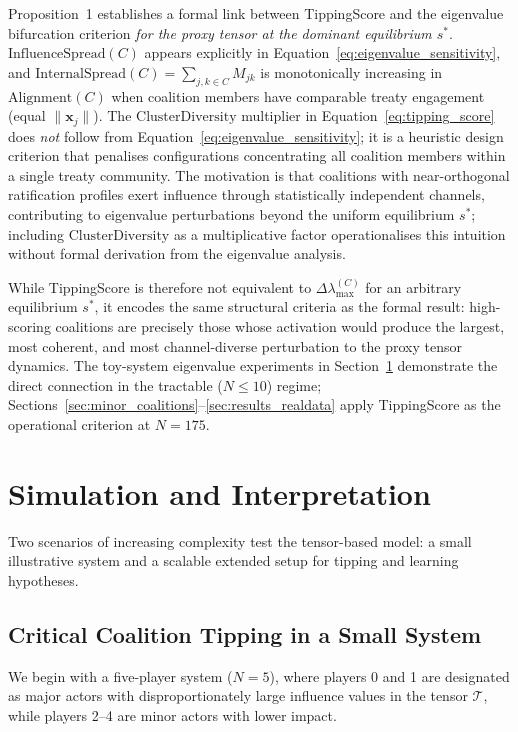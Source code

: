 \documentclass[11pt]{article}
\begin{document}
Proposition~1 establishes a formal link between TippingScore and the eigenvalue bifurcation criterion \emph{for the proxy tensor at the dominant equilibrium $s^*$}. $\mathrm{InfluenceSpread}(C)$ appears explicitly in Equation~\eqref{eq:eigenvalue_sensitivity}, and $\mathrm{InternalSpread}(C) = \sum_{j,k\in C}M_{jk}$ is monotonically increasing in $\mathrm{Alignment}(C)$ when coalition members have comparable treaty engagement (equal $\|\mathbf{x}_j\|$). The $\mathrm{ClusterDiversity}$ multiplier in Equation~\eqref{eq:tipping_score} does \emph{not} follow from Equation~\eqref{eq:eigenvalue_sensitivity}; it is a heuristic design criterion that penalises configurations concentrating all coalition members within a single treaty community. The motivation is that coalitions with near-orthogonal ratification profiles exert influence through statistically independent channels, contributing to eigenvalue perturbations beyond the uniform equilibrium $s^*$; including $\mathrm{ClusterDiversity}$ as a multiplicative factor operationalises this intuition without formal derivation from the eigenvalue analysis.

While TippingScore is therefore not equivalent to $\Delta\lambda_{\max}^{(C)}$ for an arbitrary equilibrium $s^*$, it encodes the same structural criteria as the formal result: high-scoring coalitions are precisely those whose activation would produce the largest, most coherent, and most channel-diverse perturbation to the proxy tensor dynamics. The toy-system eigenvalue experiments in Section~\ref{sec:simulation} demonstrate the direct connection in the tractable ($N \leq 10$) regime; Sections~\ref{sec:minor_coalitions}--\ref{sec:results_realdata} apply TippingScore as the operational criterion at $N = 175$.


\section{Simulation and Interpretation}
\label{sec:simulation}

Two scenarios of increasing complexity test the tensor-based model: a small illustrative system and a scalable extended setup for tipping and learning hypotheses.

\subsection{Critical Coalition Tipping in a Small System}

We begin with a five-player system ($N=5$), where players 0 and 1 are designated as major actors with disproportionately large influence values in the tensor $\mathcal{T}$, while players 2--4 are minor actors with lower impact.
\end{document}

